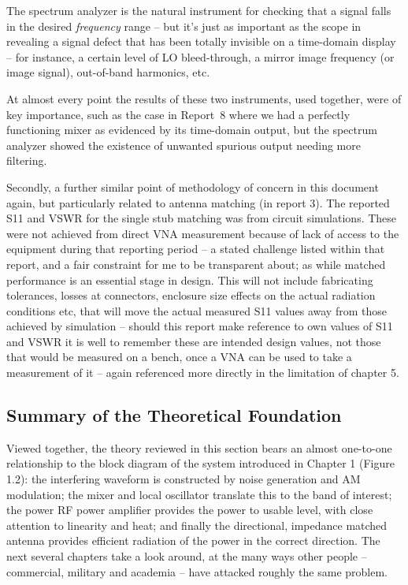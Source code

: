 \documentclass[12pt,a4paper]{report}
\begin{document}
	The spectrum analyzer is the natural instrument for checking that a signal falls in the desired \emph{frequency} range -- but it's just as important as the scope in revealing a signal defect that has been totally invisible on a time-domain display -- for instance, a certain level of LO bleed-through, a mirror image frequency (or image signal), out-of-band harmonics, etc. 
	
	At almost every point the results of these two instruments, used together, were of key importance, such as the case in Report~8 where we had a perfectly functioning mixer as evidenced by its time-domain output, but the spectrum analyzer showed the existence of unwanted spurious output needing more filtering.
	
	Secondly, a further similar point of methodology of concern in this document again, but particularly related to antenna matching (in report 3). The reported S11 and VSWR for the single stub matching was from circuit simulations. These were not achieved from direct VNA measurement because of lack of access to the equipment during that reporting period -- a stated challenge listed within that report, and a fair constraint for me to be transparent about; as while matched performance is an essential stage in design. This will not include fabricating tolerances, losses at connectors, enclosure size effects on the actual radiation conditions etc, that will move the actual measured S11 values away from those achieved by simulation -- should this report make reference to own values of S11 and VSWR it is well to remember these are intended design values, not those that would be measured on a bench, once a VNA can be used to take a measurement of it -- again referenced more directly in the limitation of chapter 5.
	
	\subsection{Summary of the Theoretical Foundation}
	
	Viewed together, the theory reviewed in this section bears an almost one-to-one relationship to the block diagram of the system introduced in Chapter 1 (Figure 1.2): the interfering waveform is constructed by noise generation and AM modulation; the mixer and local oscillator translate this to the band of interest; the power RF power amplifier provides the power to usable level, with close attention to linearity and heat; and finally the directional, impedance matched antenna provides efficient radiation of the power in the correct direction. The next several chapters take a look around, at the many ways other people -- commercial, military and academia -- have attacked roughly the same problem.
\end{document}
